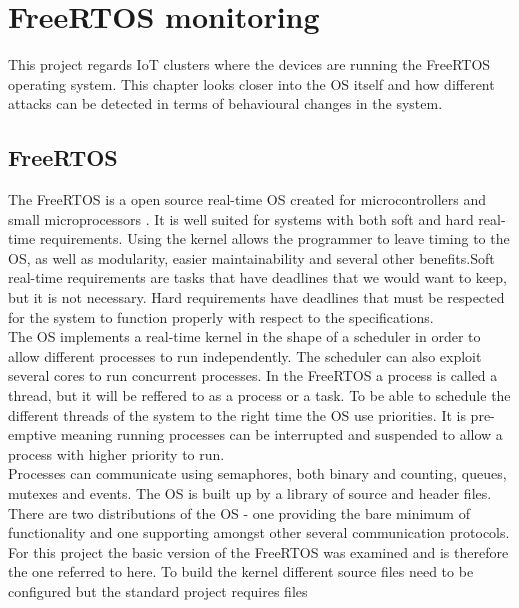 \chapter{FreeRTOS monitoring} \label{chap:freertos}

This project regards IoT clusters where the devices are running the FreeRTOS operating system. This chapter looks closer into the OS itself and how different attacks can be detected in terms of behavioural changes in the system. \\ 

\section{FreeRTOS}

The FreeRTOS is a open source real-time OS created for microcontrollers and small microprocessors \cite{manual:freeRTOS}. It is well suited for systems with both soft and hard real-time requirements. Using the kernel allows the programmer to leave timing to the OS, as well as modularity, easier maintainability and several other benefits.Soft real-time requirements are tasks that have deadlines that we would want to keep, but it is not necessary. Hard requirements have deadlines that must be respected for the system to function properly with respect to the specifications.\\

The OS implements a real-time kernel in the shape of a scheduler in order to allow different processes to run independently. The scheduler can also exploit several cores to run concurrent processes. In the FreeRTOS a process is called a thread, but it will be reffered to as a process or a task. To be able to schedule the different threads of the system to the right time the OS use priorities. It is pre-emptive meaning running processes can be interrupted and suspended to allow a process with higher priority to run.\\

Processes can communicate using semaphores, both binary and counting, queues, mutexes and events. The OS is built up by a library of source and header files. There are two distributions of the OS - one providing the bare minimum of functionality and one supporting amongst other several communication protocols. For this project the basic version of the FreeRTOS was examined and is therefore the one referred to here. To build the kernel different source files need to be configured but the standard project requires files

